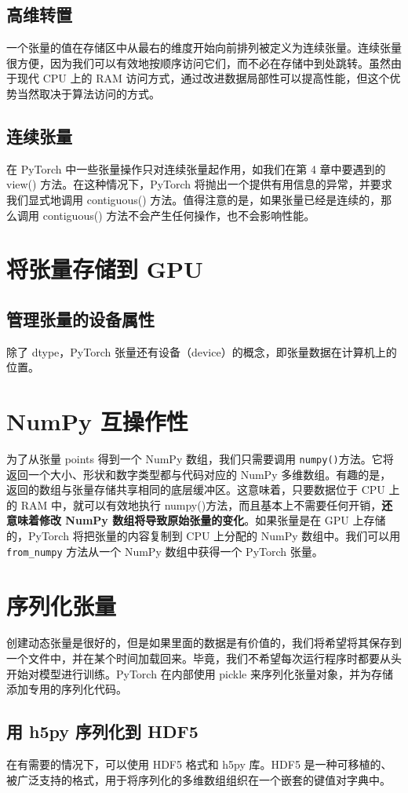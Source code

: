 \subsection{高维转置}
一个张量的值在存储区中从最右的维度开始向前排列被定义为连续张量。连续张量很方便，因为我们可以有效地按顺序访问它们，而不必在存储中到处跳转。虽然由于现代 CPU 上的 RAM 访问方式，通过改进数据局部性可以提高性能，但这个优势当然取决于算法访问的方式。

\subsection{连续张量}
在 PyTorch 中一些张量操作只对连续张量起作用，如我们在第 4 章中要遇到的 view() 方法。在这种情况下，PyTorch 将抛出一个提供有用信息的异常，并要求我们显式地调用 contiguous() 方法。值得注意的是，如果张量已经是连续的，那么调用 contiguous() 方法不会产生任何操作，也不会影响性能。
\section{将张量存储到 GPU}
\subsection{管理张量的设备属性}
除了 dtype，PyTorch 张量还有设备（device）的概念，即张量数据在计算机上的位置。
\section{NumPy 互操作性}
为了从张量 points 得到一个 NumPy 数组，我们只需要调用 \verb|numpy()|方法。它将返回一个大小、形状和数字类型都与代码对应的 NumPy 多维数组。有趣的是，返回的数组与张量存储共享相同的底层缓冲区。这意味着，只要数据位于 CPU 上的 RAM 中，就可以有效地执行 numpy()方法，而且基本上不需要任何开销，\textbf{还意味着修改 NumPy 数组将导致原始张量的变化}。如果张量是在 GPU 上存储的，PyTorch 将把张量的内容复制到 CPU 上分配的 NumPy 数组中。我们可以用 \verb|from_numpy| 方法从一个 NumPy 数组中获得一个 PyTorch 张量。
\section{序列化张量}
创建动态张量是很好的，但是如果里面的数据是有价值的，我们将希望将其保存到一个文件中，并在某个时间加载回来。毕竟，我们不希望每次运行程序时都要从头开始对模型进行训练。PyTorch 在内部使用 pickle 来序列化张量对象，并为存储添加专用的序列化代码。
\subsection{用 h5py 序列化到 HDF5}
在有需要的情况下，可以使用 HDF5 格式和 h5py 库。HDF5 是一种可移植的、被广泛支持的格式，用于将序列化的多维数组组织在一个嵌套的键值对字典中。